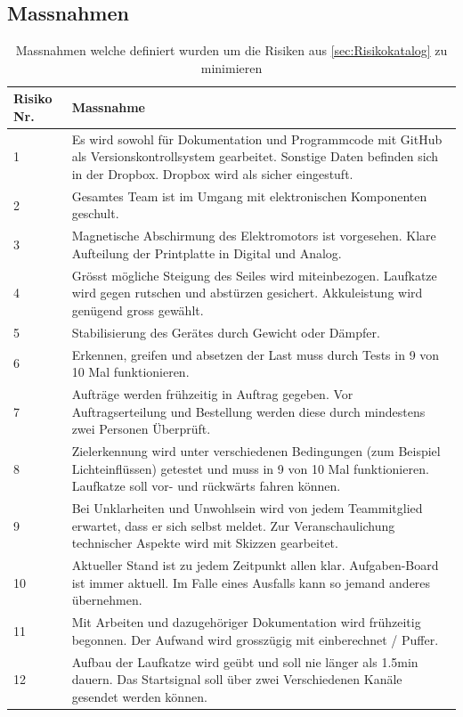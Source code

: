 \documentclass[a4paper]{report}
\begin{document}
\newpage
\subsection{Massnahmen}
\label{sec:Massnahmen}
\vspace{1em}
\noindent
\begin{table}[h!]
	\centering
	\begin{tabular}{|p{}|p{}|}
		\hline
		\textbf{Risiko Nr.} & \textbf{Massnahme} \\
		\hline
		1 & Es wird sowohl für Dokumentation und Programmcode mit GitHub als Versionskontrollsystem gearbeitet. Sonstige Daten befinden sich in der Dropbox. Dropbox wird als sicher eingestuft. \\
		\hline
		2 & Gesamtes Team ist im Umgang mit elektronischen Komponenten geschult. \\
		\hline
		3 & Magnetische Abschirmung des Elektromotors ist vorgesehen. Klare Aufteilung der Printplatte in Digital und Analog. \\
		\hline
		4 & Grösst mögliche Steigung des Seiles wird miteinbezogen. Laufkatze wird gegen rutschen und abstürzen gesichert. Akkuleistung wird genügend gross gewählt. \\
		\hline
		5 & Stabilisierung des Gerätes durch Gewicht oder Dämpfer. \\
		\hline
		6 & Erkennen, greifen und absetzen der Last muss durch Tests in 9 von 10 Mal funktionieren. \\
		\hline
		7 & Aufträge werden frühzeitig in Auftrag gegeben. Vor Auftragserteilung und Bestellung werden diese durch mindestens zwei Personen Überprüft.\\
		\hline
		8 & Zielerkennung wird unter verschiedenen Bedingungen (zum Beispiel Lichteinflüssen) getestet und muss in 9 von 10 Mal funktionieren. Laufkatze soll vor- und rückwärts fahren können. \\
		\hline
		9 & Bei Unklarheiten und Unwohlsein wird von jedem Teammitglied erwartet, dass er sich selbst meldet. Zur Veranschaulichung technischer Aspekte wird mit Skizzen gearbeitet. \\
		\hline
		10 & Aktueller Stand ist zu jedem Zeitpunkt allen klar. Aufgaben-Board ist immer aktuell. Im Falle eines Ausfalls kann so jemand anderes übernehmen. \\
		\hline
		11 & Mit Arbeiten und dazugehöriger Dokumentation wird frühzeitig begonnen. Der Aufwand wird grosszügig mit einberechnet / Puffer. \\
		\hline
		12 & Aufbau der Laufkatze wird geübt und soll nie länger als 1.5min dauern. Das Startsignal soll über zwei Verschiedenen Kanäle gesendet werden können. \\
		\hline
	\end{tabular}
	\caption{Massnahmen welche definiert wurden um die Risiken aus \ref{sec:Risikokatalog} zu minimieren}
	\label{tab:Massnahmen}
\end{table}
\end{document}
